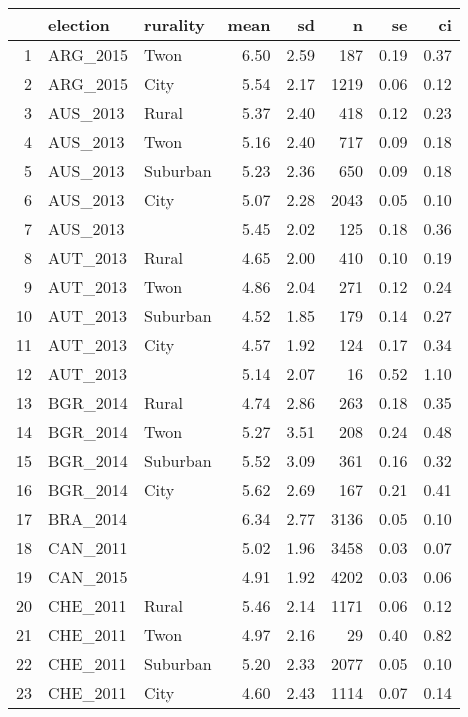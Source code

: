 \begin{table}[ht]
\centering
\begin{tabular}{rllrrrrr}
  \hline
 & election & rurality & mean & sd & n & se & ci \\ 
  \hline
1 & ARG\_2015 & Twon & 6.50 & 2.59 & 187 & 0.19 & 0.37 \\ 
  2 & ARG\_2015 & City & 5.54 & 2.17 & 1219 & 0.06 & 0.12 \\ 
  3 & AUS\_2013 & Rural & 5.37 & 2.40 & 418 & 0.12 & 0.23 \\ 
  4 & AUS\_2013 & Twon & 5.16 & 2.40 & 717 & 0.09 & 0.18 \\ 
  5 & AUS\_2013 & Suburban & 5.23 & 2.36 & 650 & 0.09 & 0.18 \\ 
  6 & AUS\_2013 & City & 5.07 & 2.28 & 2043 & 0.05 & 0.10 \\ 
  7 & AUS\_2013 &  & 5.45 & 2.02 & 125 & 0.18 & 0.36 \\ 
  8 & AUT\_2013 & Rural & 4.65 & 2.00 & 410 & 0.10 & 0.19 \\ 
  9 & AUT\_2013 & Twon & 4.86 & 2.04 & 271 & 0.12 & 0.24 \\ 
  10 & AUT\_2013 & Suburban & 4.52 & 1.85 & 179 & 0.14 & 0.27 \\ 
  11 & AUT\_2013 & City & 4.57 & 1.92 & 124 & 0.17 & 0.34 \\ 
  12 & AUT\_2013 &  & 5.14 & 2.07 &  16 & 0.52 & 1.10 \\ 
  13 & BGR\_2014 & Rural & 4.74 & 2.86 & 263 & 0.18 & 0.35 \\ 
  14 & BGR\_2014 & Twon & 5.27 & 3.51 & 208 & 0.24 & 0.48 \\ 
  15 & BGR\_2014 & Suburban & 5.52 & 3.09 & 361 & 0.16 & 0.32 \\ 
  16 & BGR\_2014 & City & 5.62 & 2.69 & 167 & 0.21 & 0.41 \\ 
  17 & BRA\_2014 &  & 6.34 & 2.77 & 3136 & 0.05 & 0.10 \\ 
  18 & CAN\_2011 &  & 5.02 & 1.96 & 3458 & 0.03 & 0.07 \\ 
  19 & CAN\_2015 &  & 4.91 & 1.92 & 4202 & 0.03 & 0.06 \\ 
  20 & CHE\_2011 & Rural & 5.46 & 2.14 & 1171 & 0.06 & 0.12 \\ 
  21 & CHE\_2011 & Twon & 4.97 & 2.16 &  29 & 0.40 & 0.82 \\ 
  22 & CHE\_2011 & Suburban & 5.20 & 2.33 & 2077 & 0.05 & 0.10 \\ 
  23 & CHE\_2011 & City & 4.60 & 2.43 & 1114 & 0.07 & 0.14 \\ 

\end{tabular}
\end{table}
